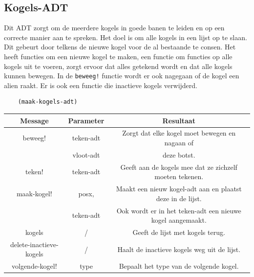 \documentclass[]{article}
\begin{document}
\subsection{Kogels-ADT}
Dit ADT zorgt om de meerdere kogels in goede banen te leiden en op een correcte manier aan te spreken. Het doel is om alle kogels in een lijst op te slaan. Dit gebeurt door telkens de nieuwe kogel voor de al bestaande te consen. Het heeft functies om een nieuwe kogel te maken, een functie om functies op alle kogels uit te voeren, zorgt ervoor dat alles getekend wordt en dat alle kogels kunnen bewegen. In de \texttt{beweeg!} functie wordt er ook nagegaan of de kogel een alien raakt. Er is ook een functie die inactieve kogels verwijderd.
\begin{center}
	\begin{lstlisting}
	(maak-kogels-adt)
	\end{lstlisting}
	\begin{tabular}{|c|c|c|}
		\hline  \textbf{Message} & \textbf{Parameter} & \textbf{Resultaat}  \\
		\hline beweeg! & teken-adt &Zorgt dat elke kogel moet bewegen en nagaan of \\ & vloot-adt & deze botst. \\
		\hline teken! & teken-adt&  Geeft aan de kogels mee dat ze zichzelf moeten tekenen. \\
		\hline maak-kogel! & posx, & Maakt een nieuw kogel-adt aan en plaatst deze in de lijst. \\ &teken-adt & Ook wordt er in het teken-adt een nieuwe kogel aangemaakt. \\
		\hline kogels & / & Geeft de lijst met kogels terug. \\
		\hline delete-inactieve-kogels & / & Haalt de inactieve kogels weg uit de lijst. \\
		\hline volgende-kogel! & type & Bepaalt het type van de volgende kogel. \\
		\hline
	\end{tabular}
\end{center}
\end{document}
